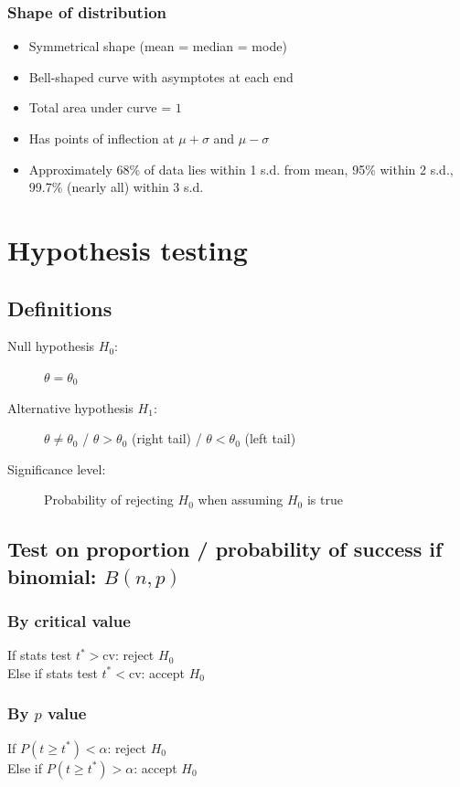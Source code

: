 \documentclass[A4paper]{article}
\begin{document}
	\subsubsection{Shape of distribution}
	\begin{itemize}
		\item Symmetrical shape (mean = median = mode)
		\item Bell-shaped curve with asymptotes at each end
		\item Total area under curve = $1$
		\item Has points of inflection at $\mu+\sigma$ and $\mu-\sigma$
		\item Approximately 68\% of data lies within 1 s.d. from mean, 95\% within 2 s.d., 99.7\% (nearly all) within 3 s.d.
	\end{itemize}
	
	\pagebreak
	
	\section{Hypothesis testing}
	\subsection{Definitions}
	\begin{description}
		\item[Null hypothesis $H_0$:] $\theta=\theta_0$
		\item[Alternative hypothesis $H_1$:] $\theta \neq \theta_0$ / $\theta>\theta_0$ (right tail) / $\theta<\theta_0$ (left tail)
		\item[Significance level:] Probability of rejecting $H_0$ when assuming $H_0$ is true
	\end{description}
	\subsection{Test on proportion / probability of success if binomial: $B(n,p)$}
	\subsubsection{By critical value}
	If stats test $t^* > \text{cv}$: reject $H_0$\\
	Else if stats test $t^* < \text{cv}$: accept $H_0$
	
	\subsubsection{By $p$ value}
	If $P(t\geq t^*) < \alpha$: reject $H_0$\\
	Else if $P(t \geq t^*) > \alpha$: accept $H_0$
	
\end{document}
